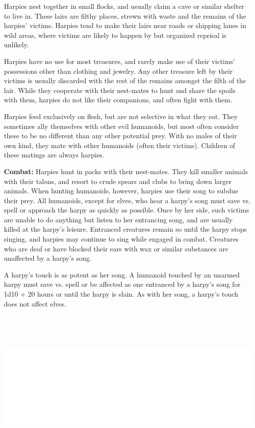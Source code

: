 \begin{multicols}{2}
Harpies nest together in small flocks, and usually claim a cave or similar shelter to live in. These lairs are filthy places, strewn with waste and the remains of the harpies' victims. Harpies tend to make their lairs near roads or shipping lanes in wild areas, where victims are likely to happen by but organized reprisal is unlikely.

Harpies have no use for most treasures, and rarely make use of their victims' possessions other than clothing and jewelry. Any other treasure left by their victims is usually discarded with the rest of the remains amongst the filth of the lair. While they cooperate with their nest-mates to hunt and share the spoils with them, harpies do not like their companions, and often fight with them.

Harpies feed exclusively on flesh, but are not selective in what they eat. They sometimes ally themselves with other evil humanoids, but most often consider these to be no different than any other potential prey. With no males of their own kind, they mate with other humanoids (often their victims). Children of these matings are always harpies.

\textbf{Combat:} Harpies hunt in packs with their nest-mates. They kill smaller animals with their talons, and resort to crude spears and clubs to bring down larger animals. When hunting humanoids, however, harpies use their song to subdue their prey. All humanoids, except for elves, who hear a harpy's song must save vs. spell or approach the harpy as quickly as possible. Once by her side, such victims are unable to do anything but listen to her entrancing song, and are usually killed at the harpy's leisure. Entranced creatures remain so until the harpy stops singing, and harpies may continue to sing while engaged in combat. Creatures who are deaf or have blocked their ears with wax or similar substances are unaffected by a harpy's song.

A harpy's touch is as potent as her song. A humanoid touched by an unarmed harpy must save vs. spell or be affected as one entranced by a harpy's song for 1d10 + 20 hours or until the harpy is slain. As with her song, a harpy's touch does not affect elves. 

\noindent\includegraphics[width=\columnwidth, height=3in]{testblock.pdf}


\end{multicols}

